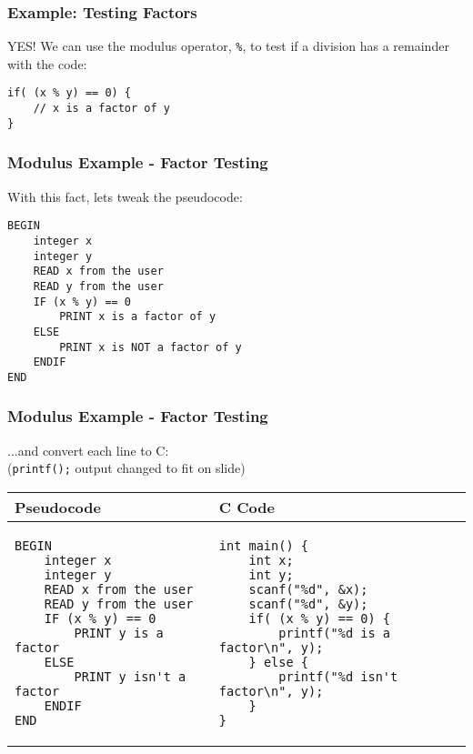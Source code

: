\documentclass[14pt]{beamer}
\begin{document}
\begin{frame}[fragile]
\frametitle{Example: Testing Factors}
YES! We can use the modulus operator, \texttt{\%}, to test if a division has a remainder with the code:

\begin{lstlisting}[style=CStyle]
if( (x % y) == 0) {
	// x is a factor of y
}
\end{lstlisting}

\end{frame}

\begin{frame}[fragile]
\frametitle{Modulus Example - Factor Testing}
With this fact, lets tweak the pseudocode:
\begin{lstlisting}[style=pseudo]
BEGIN
	integer x
	integer y
	READ x from the user
	READ y from the user
	IF (x % y) == 0
		PRINT x is a factor of y
	ELSE
		PRINT x is NOT a factor of y
	ENDIF
END
\end{lstlisting}
\end{frame}

\begin{frame}[fragile]
\frametitle{Modulus Example - Factor Testing}
...and convert each line to C:\\
\vspace{4mm}
\small{(\texttt{printf();} output changed to fit on slide)}
\vspace{-2mm}
\begin{table}[H]
\centering

\begin{tabular}{ll}
Pseudocode & C Code \\
\hline

\begin{lstlisting}[style=pseudo,basicstyle=\ttfamily\scriptsize]
BEGIN
	integer x
	integer y
	READ x from the user
	READ y from the user
	IF (x % y) == 0
		PRINT y is a factor
	ELSE
		PRINT y isn't a factor
	ENDIF
END
\end{lstlisting} &

\begin{lstlisting}[style=Ctable,basicstyle=\ttfamily\scriptsize]
int main() {
	int x;
	int y;
	scanf("%d", &x);
	scanf("%d", &y);
	if( (x % y) == 0) {
		printf("%d is a factor\n", y);
	} else {
		printf("%d isn't factor\n", y);
	}
}
\end{lstlisting}
\\

\hline
\end{tabular}
\end{table}

\end{frame}
\end{document}

